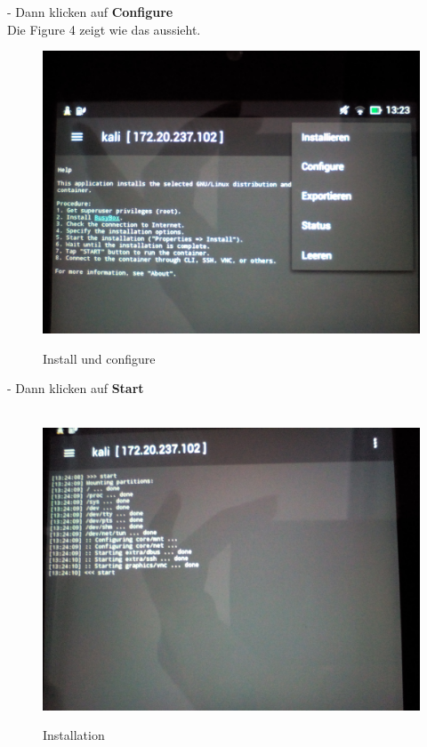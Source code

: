 \documentclass[11pt,a4paper]{article}
\begin{document}
- Dann klicken auf \textbf{Configure} \\
Die Figure 4 zeigt wie das aussieht. 

\begin{figure}[H]
\begin{center} \includegraphics[scale=0.1]{./Image/img4}  \\
\caption{Install und configure}
\end{center}
\end{figure} 

- Dann klicken auf \textbf{Start} \\ \\

\begin{figure}[H]
\begin{center} \includegraphics[scale=0.1]{./Image/img5}  \\
\caption{Installation}
\end{center}
\end{figure} 
\end{document}
